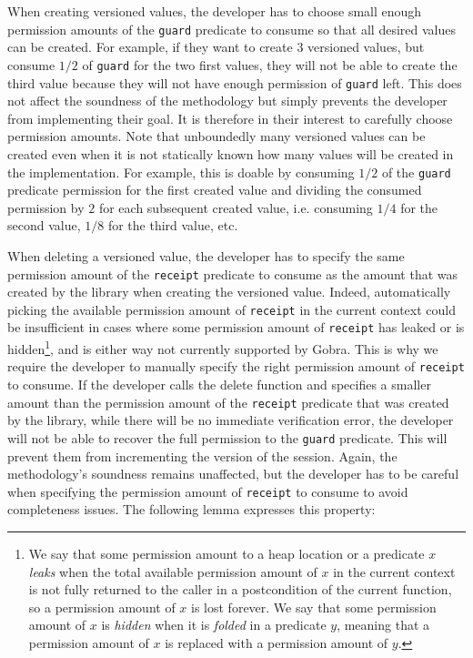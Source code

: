 When creating versioned values, the developer has to choose small enough permission amounts of the \texttt{guard} predicate to consume so that all desired values can be created.
For example, if they want to create $3$ versioned values, but consume $1/2$ of \texttt{guard} for the two first values, they will not be able to create the third value because they will not have enough permission of \texttt{guard} left.
This does not affect the soundness of the methodology but simply prevents the developer from implementing their goal.
It is therefore in their interest to carefully choose permission amounts.
Note that unboundedly many versioned values can be created even when it is not statically known how many values will be created in the implementation.
For example, this is doable by consuming $1/2$ of the \texttt{guard} predicate permission for the first created value and dividing the consumed permission by $2$ for each subsequent created value, i.e. consuming $1/4$ for the second value, $1/8$ for the third value, etc.

When deleting a versioned value, the developer has to specify the same permission amount of the \texttt{receipt} predicate to consume as the amount that was created by the library when creating the versioned value.
Indeed, automatically picking the available permission amount of \texttt{receipt} in the current context could be insufficient in cases where some permission amount of \texttt{receipt} has leaked or is hidden\footnote{We say that some permission amount to a heap location or a predicate $x$ \emph{leaks} when the total available permission amount of $x$ in the current context is not fully returned to the caller in a postcondition of the current function, so a permission amount of $x$ is lost forever. We say that some permission amount of $x$ is \emph{hidden} when it is \emph{folded} in a predicate $y$, meaning that a permission amount of $x$ is replaced with a permission amount of $y$.}, and is either way not currently supported by Gobra.
This is why we require the developer to manually specify the right permission amount of \texttt{receipt} to consume.
If the developer calls the delete function and specifies a smaller amount than the permission amount of the \texttt{receipt} predicate that was created by the library, while there will be no immediate verification error, the developer will not be able to recover the full permission to the \texttt{guard} predicate.
This will prevent them from incrementing the version of the session.
Again, the methodology's soundness remains unaffected, but the developer has to be careful when specifying the permission amount of \texttt{receipt} to consume to avoid completeness issues.
The following lemma expresses this property:

